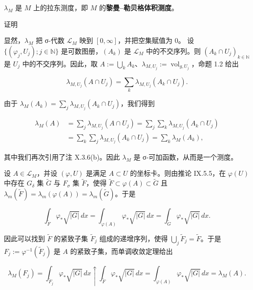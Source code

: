 \begin{proposition}

$ \lambda_M $ 是 $ M $ 上的拉东测度，即 $ M $ 的\textbf{黎曼–勒贝格体积测度}。

证明

\begin{items}
\item

显然，$ \lambda_M $ 把 σ-代数 $ \mathcal{L}_M $ 映到 $ [0, \infty] $，并把空集赋值为 0。
设 $ \{(\varphi_j, U_j) ; j \in \mathbb{N}\} $ 是可数图册，$ (A_k) $ 是 $ \mathcal{L}_M $ 中的不交序列。则 $ (A_k \cap U_j)_{k \in \mathbb{N}} $ 是 $ U_j $ 中的不交序列。因此，取 $ A := \bigcup_k A_k $、$ \lambda_{M,U_j} := \operatorname{vol}_{g,U_j} $，命题 1.2 给出

\[
\lambda_{M,U_j}(A \cap U_j) = \sum_k \lambda_{M,U_j}(A_k \cap U_j) .
\]

由于 $ \lambda_M(A_k) = \sum_j \lambda_{M,U_j}(A_k \cap U_j) $，我们得到

\begin{equation*}
\begin{aligned}
\lambda_M(A) &= \sum_j \lambda_{M,U_j}(A \cap U_j) = \sum_j \sum_k \lambda_{M,U_j}(A_k \cap U_j) \\ &= \sum_k \sum_j \lambda_{M,U_j}(A_k \cap U_j) = \sum_k \lambda_M(A_k) ,
\end{aligned}
\end{equation*}

其中我们再次引用了注 X.3.6(b)。因此 $ \lambda_M $ 是 σ-可加函数，从而是一个测度。

\item

设 $ A \in \mathcal{L}_M $，并设 $ (\varphi, U) $ 是满足 $ A \subset U $ 的坐标卡。则由推论 IX.5.5，在 $ \varphi(U) $ 中存在 $ G_\delta $ 集 $ \widetilde{G} $ 与 $ F_\sigma $ 集 $ \widetilde{F} $，使得 $ \widetilde{F} \subset \varphi(A) \subset \widetilde{G} $ 且 $ \lambda_m(\widetilde{F}) = \lambda_m(\varphi(A)) = \lambda_m(\widetilde{G}) $。于是

\[
\int_{\widetilde{F}} \varphi_*\sqrt{|G|} \, dx = \int_{\varphi(A)} \varphi_*\sqrt{|G|} \, dx = \int_{\widetilde{G}} \varphi_*\sqrt{|G|} \, dx .
\]

因此可以找到 $ \widetilde{F} $ 的紧致子集 $ \widetilde{F}_j $ 组成的递增序列，使得 $ \bigcup_j \widetilde{F}_j = \widetilde{F} $。于是 $ F_j := \varphi^{-1}(\widetilde{F}_j) $ 是 $ A $ 的紧致子集，而单调收敛定理给出

\[
\lambda_M(F_j) = \int_{\widetilde{F}_j} \varphi_*\sqrt{|G|} \, dx \uparrow \int_{\widetilde{F}} \varphi_*\sqrt{|G|} \, dx = \int_{\varphi(A)} \varphi_*\sqrt{|G|} \, dx = \lambda_M(A) .
\]


\end{items}
\end{proposition}
